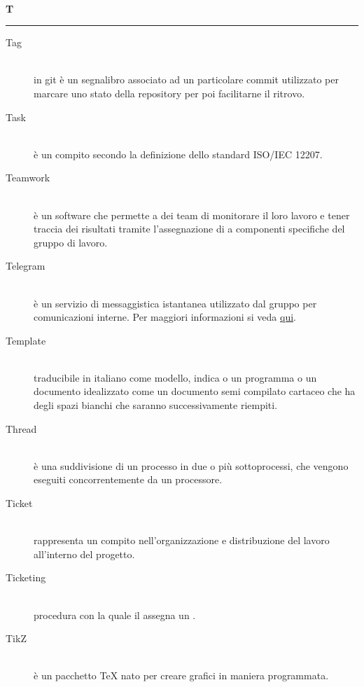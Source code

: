 \documentclass[12pt,a4paper]{article}
\begin{document}
\newpage

\begin{center}
\hfill\\
	\LARGE \textbf{T}
\hfill\\
\rule[15pt]{30pt}{0.5pt}
\end{center}

\begin{description}
\item[Tag] 
\hfill\\in git è un segnalibro associato ad un particolare commit utilizzato per marcare uno stato della repository per poi facilitarne il ritrovo.

\item[Task] 
\hfill\\è un compito secondo la definizione dello standard ISO/IEC 12207.

\item[Teamwork] 
\hfill\\è un software che permette a dei team di monitorare il loro lavoro e tener traccia dei risultati tramite l'assegnazione di  a componenti specifiche del gruppo di lavoro.

\item[Telegram] 
\hfill\\è un servizio di messaggistica istantanea utilizzato dal gruppo per comunicazioni interne. Per maggiori informazioni si veda \href{https://it.wikipedia.org/wiki/Telegram_(software)}{qui}.

\item[Template] 
\hfill\\traducibile in italiano come modello, indica o un programma o un documento idealizzato come un documento semi compilato cartaceo che ha degli spazi bianchi che saranno successivamente riempiti.

\item[Thread] 
\hfill\\è una suddivisione di un processo in due o più sottoprocessi, che vengono eseguiti concorrentemente da un processore.

\item[Ticket] 
\hfill\\rappresenta un compito nell'organizzazione e distribuzione del lavoro all'interno del progetto.

\item[Ticketing] 
\hfill\\procedura con la quale il \RE assegna un .

\item[TikZ] 
\hfill\\è un pacchetto TeX nato per creare grafici in maniera programmata.


\end{description}
\end{document}
